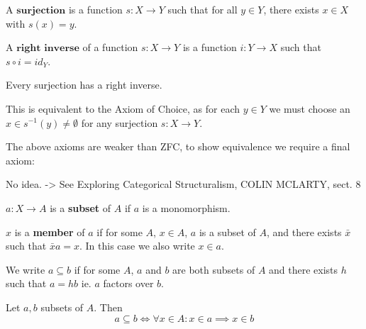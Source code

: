\begin{definition}
A $\textbf{surjection}$ is a function $s: X \longrightarrow Y$ such that for all $y \in Y$, there exists $x \in X$ with $s(x) = y$.
\end{definition}

\begin{definition}
A $\textbf{right inverse}$ of a function $s: X \longrightarrow Y$ is a function $i: Y \longrightarrow X$ such that $s \circ i = id_Y$.
\end{definition}

\begin{axiom}[Choice]
Every surjection has a right inverse.
\end{axiom}

\begin{remark}
This is equivalent to the Axiom of Choice, as for each $y \in Y$ we must choose an $x \in s^{-1}(y) \neq \emptyset$ for any surjection $s: X \longrightarrow Y$.
\end{remark}

\begin{remark}
The above axioms are weaker than ZFC, to show equivalence we require a final axiom:
\end{remark}

\begin{axiom}[Replacement]
No idea. -> See Exploring Categorical Structuralism, COLIN MCLARTY, sect. 8
\end{axiom}

\begin{definition}
$a:X \longrightarrow A$ is a \textbf{subset} of $A$ if $a$ is a monomorphism.

$x$ is a \textbf{member} of $a$ if for some $A$, $x \in A$, $a$ is a subset of $A$, and there exists $\bar{x}$ such that $\bar{x}a = x$. In this case we also write $x \in a$.

We write $a \subseteq b$ if for some $A$, $a$ and $b$ are both subsets of $A$ and there exists $h$ such that $a = hb$ ie. $a$ factors over $b$.
\end{definition}

\begin{theorem}
Let $a, b$ subsets of $A$. Then
\begin{equation}
a \subseteq b \iff \forall x \in A: x \in a \implies x \in b
\end{equation}
\end{theorem}

